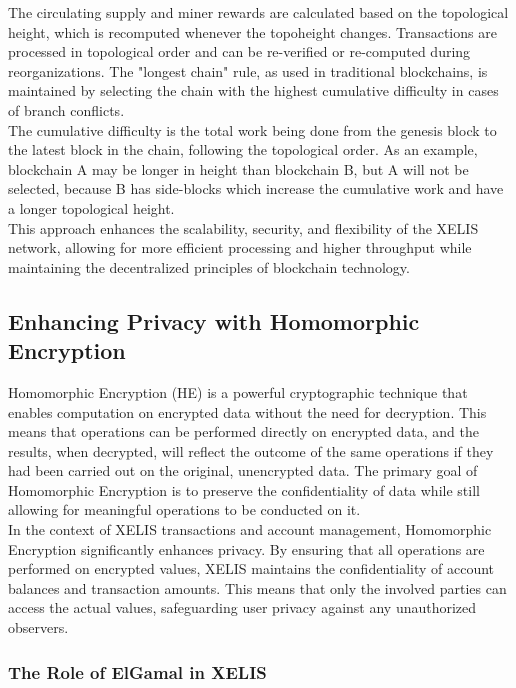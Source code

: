 \documentclass[12pt,a4paper,twocolumn]{article}
\begin{document}
The circulating supply and miner rewards are calculated based on the topological height, which is recomputed whenever the topoheight changes. Transactions are processed in topological order and can be re-verified or re-computed during reorganizations. The "longest chain" rule, as used in traditional blockchains, is maintained by selecting the chain with the highest cumulative difficulty in cases of branch conflicts.\\

The cumulative difficulty is the total work being done from the genesis block to the latest block in the chain, following the topological order. As an example, blockchain A may be longer in height than blockchain B, but A will not be selected, because B has side-blocks which increase the cumulative work and have a longer topological height.\\

This approach enhances the scalability, security, and flexibility of the XELIS network, allowing for more efficient processing and higher throughput while maintaining the decentralized principles of blockchain technology.\\

\subsection{Enhancing Privacy with Homomorphic Encryption}

Homomorphic Encryption (HE) is a powerful cryptographic technique that enables computation on encrypted data without the need for decryption. This means that operations can be performed directly on encrypted data, and the results, when decrypted, will reflect the outcome of the same operations if they had been carried out on the original, unencrypted data. The primary goal of Homomorphic Encryption is to preserve the confidentiality of data while still allowing for meaningful operations to be conducted on it.\\

In the context of XELIS transactions and account management, Homomorphic Encryption significantly enhances privacy. By ensuring that all operations are performed on encrypted values, XELIS maintains the confidentiality of account balances and transaction amounts. This means that only the involved parties can access the actual values, safeguarding user privacy against any unauthorized observers.\\

\subsubsection{The Role of ElGamal in XELIS}
\end{document}

